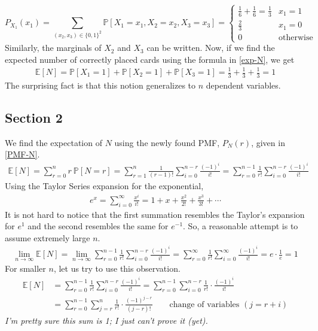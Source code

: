 \documentclass[9pt]{article}
\begin{document}
\begin{equation*}
    P_{X_{1}}(x_{1}) = \sum_{(x_{2}, x_{3}) \in \{ 0, 1 \}^{2} } \mathbb{P}[X_{1} = x_{1}, X_{2} = x_{2}, X_{3} = x_{3}]
    = \begin{cases}
        \frac{1}{6} + \frac{1}{6} = \frac{1}{3} & x_{1} = 1 \\
        \frac{2}{3} & x_{1} = 0 \\
        0 & \text{otherwise}
    \end{cases}
\end{equation*}
Similarly, the marginals of $X_{2}$ and $X_{3}$ can be written. Now, if we find the expected number
of correctly placed cards using the formula in \eqref{exp-N}, we get
\begin{align*}
    \mathbb{E}[N] = \mathbb{P}[X_{1} = 1] + \mathbb{P}[X_{2} = 1] + \mathbb{P}[X_{3} = 1] = \frac{1}{3} + \frac{1}{3} + \frac{1}{3} = 1
\end{align*}
The surprising fact is that this notion generalizes to $n$ dependent variables.

\subsection*{\textbf{Section 2}}
We find the expectation of $N$ using the newly found PMF, $P_{N}(r)$, given in \eqref{PMF-N}.
\begin{align*}
    \mathbb{E}[N] = \sum_{r=0}^{n} r \ \mathbb{P}[N = r] = \sum_{r=1}^{n} \frac{1}{(r-1)!} \sum_{i=0}^{n-r} \frac{(-1)^{i}}{i!}
    = \sum_{r=0}^{n-1} \frac{1}{r!} \sum_{i=0}^{n-r} \frac{(-1)^{i}}{i!}
\end{align*}
Using the Taylor Series expansion for the exponential,
\begin{align*}
    e^{x} = \sum_{i=0}^{\infty} \frac{x^{i}}{i!} = 1 + x + \frac{x^{2}}{2!} + \frac{x^{3}}{3!} + \cdots
\end{align*}
It is not hard to notice that the first summation resembles the Taylor's expansion for
$e^{1}$ and the second resembles the same for $e^{-1}$. So, a reasonable attempt is to assume extremely large $n$.
\begin{align*}
    \lim_{n \to \infty} \mathbb{E}[N] = \lim_{n \to \infty} \sum_{r=0}^{n-1} \frac{1}{r!} \sum_{i=0}^{n-r} \frac{(-1)^{i}}{i!}
    = \sum_{r=0}^{\infty} \frac{1}{r!} \sum_{i=0}^{\infty} \frac{(-1)^{i}}{i!} = e \cdot \frac{1}{e} = 1
\end{align*}
For smaller $n$, let us try to use this observation.
\begin{align*}
    \mathbb{E}[N] &= \sum_{r=0}^{n-1} \frac{1}{r!} \sum_{i=0}^{n-r} \frac{(-1)^{i}}{i!}
    = \sum_{r=0}^{n-1} \sum_{i=0}^{n-r} \frac{1}{r!} \cdot \frac{(-1)^{i}}{i!} \\
    &= \sum_{r=0}^{n-1} \sum_{j=r}^{n} \frac{1}{r!} \cdot \frac{(-1)^{j-r}}{(j-r)!}  \qquad \text{change of variables } (j = r+i)
\end{align*}
\textit{I'm pretty sure this sum is 1; I just can't prove it (yet).}
\end{document}
